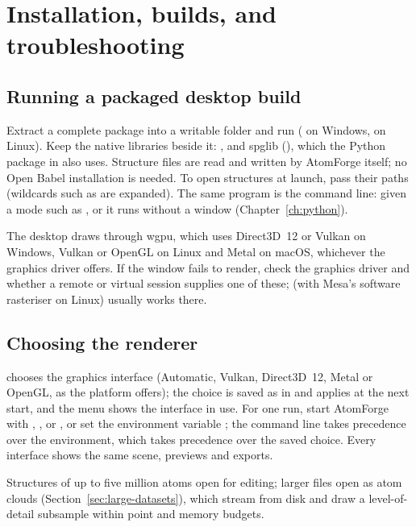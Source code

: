 \chapter{Installation, builds, and troubleshooting}\label{ch:install}
\section{Running a packaged desktop build}
Extract a complete package into a writable folder and run  ( on Windows,  on Linux). Keep the native libraries beside it: ,  and spglib (), which the Python package in  also uses. Structure files are read and written by AtomForge itself; no Open Babel installation is needed. To open structures at launch, pass their paths (wildcards such as  are expanded). The same program is the command line: given a mode such as ,  or  it runs without a window (Chapter~\ref{ch:python}).

The desktop draws through wgpu, which uses Direct3D~12 or Vulkan on Windows, Vulkan or OpenGL on Linux and Metal on macOS, whichever the graphics driver offers. If the window fails to render, check the graphics driver and whether a remote or virtual session supplies one of these;  (with Mesa's software rasteriser on Linux) usually works there.

\section{Choosing the renderer}\label{sec:renderer}
 chooses the graphics interface (Automatic, Vulkan, Direct3D~12, Metal or OpenGL, as the platform offers); the choice is saved as  in  and applies at the next start, and the menu shows the interface in use. For one run, start AtomForge with , ,  or , or set the environment variable ; the command line takes precedence over the environment, which takes precedence over the saved choice. Every interface shows the same scene, previews and exports.

Structures of up to five million atoms open for editing; larger files open as atom clouds (Section~\ref{sec:large-datasets}), which stream from disk and draw a level-of-detail subsample within point and memory budgets.

